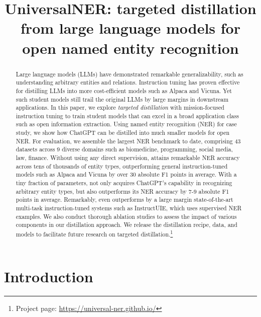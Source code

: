 \title{UniversalNER: targeted distillation from large language models for open named entity recognition}



\maketitle

\begin{abstract}
Large language models (LLMs) have demonstrated remarkable generalizability, such as understanding arbitrary entities and relations. 
Instruction tuning has proven effective for distilling LLMs into more cost-efficient models such as Alpaca and Vicuna. Yet such student models still trail the original LLMs by large margins in downstream applications. 
In this paper, we explore {\it targeted distillation} with mission-focused instruction tuning to train student models that can excel in a broad application class such as open information extraction.
Using named entity recognition (NER) for case study, we show how ChatGPT can be distilled into much smaller \longname models for open NER. 
For evaluation, we assemble the largest NER benchmark to date, comprising 43 datasets across 9 diverse domains such as biomedicine, programming, social media, law, finance.
Without using any direct supervision, \longname attains remarkable NER accuracy across tens of thousands of entity types, outperforming general instruction-tuned models such as Alpaca and Vicuna by over 30 absolute F1 points in average. 
With a tiny fraction of parameters, \longname not only acquires ChatGPT's capability in recognizing arbitrary entity types, but also outperforms its NER accuracy by 7-9 absolute F1 points in average. 
Remarkably, \longname even outperforms by a large margin state-of-the-art multi-task instruction-tuned systems such as InstructUIE, which uses supervised NER examples.
We also conduct thorough ablation studies to assess the impact of various components in our distillation approach. 
We release the distillation recipe, data, and \longname models to facilitate future research on targeted distillation.\footnote{Project page: \url{https://universal-ner.github.io/}}
\end{abstract}

\section{Introduction}


